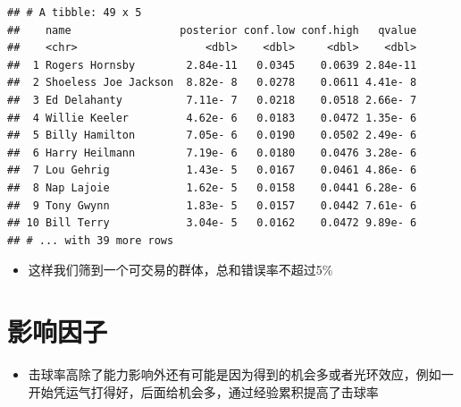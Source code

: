\documentclass[]{book}
\newenvironment{Shaded}{\begin{snugshade}}{\end{snugshade}}
\newcommand{\CommentTok}[1]{\textcolor[rgb]{0.56,0.35,0.01}{\textit{#1}}}
\newcommand{\DataTypeTok}[1]{\textcolor[rgb]{0.13,0.29,0.53}{#1}}
\newcommand{\FloatTok}[1]{\textcolor[rgb]{0.00,0.00,0.81}{#1}}
\newcommand{\KeywordTok}[1]{\textcolor[rgb]{0.13,0.29,0.53}{\textbf{#1}}}
\newcommand{\NormalTok}[1]{#1}
\newcommand{\OperatorTok}[1]{\textcolor[rgb]{0.81,0.36,0.00}{\textbf{#1}}}
\newcommand{\StringTok}[1]{\textcolor[rgb]{0.31,0.60,0.02}{#1}}
\providecommand{\tightlist}{%
  \setlength{\itemsep}{0pt}\setlength{\parskip}{0pt}}
\begin{document}
\begin{Shaded}
\end{Shaded}

\begin{verbatim}
## # A tibble: 49 x 5
##    name                 posterior conf.low conf.high   qvalue
##    <chr>                    <dbl>    <dbl>     <dbl>    <dbl>
##  1 Rogers Hornsby        2.84e-11   0.0345    0.0639 2.84e-11
##  2 Shoeless Joe Jackson  8.82e- 8   0.0278    0.0611 4.41e- 8
##  3 Ed Delahanty          7.11e- 7   0.0218    0.0518 2.66e- 7
##  4 Willie Keeler         4.62e- 6   0.0183    0.0472 1.35e- 6
##  5 Billy Hamilton        7.05e- 6   0.0190    0.0502 2.49e- 6
##  6 Harry Heilmann        7.19e- 6   0.0180    0.0476 3.28e- 6
##  7 Lou Gehrig            1.43e- 5   0.0167    0.0461 4.86e- 6
##  8 Nap Lajoie            1.62e- 5   0.0158    0.0441 6.28e- 6
##  9 Tony Gwynn            1.83e- 5   0.0157    0.0442 7.61e- 6
## 10 Bill Terry            3.04e- 5   0.0162    0.0472 9.89e- 6
## # ... with 39 more rows
\end{verbatim}

\begin{itemize}
\tightlist
\item
  这样我们筛到一个可交易的群体，总和错误率不超过5\%
\end{itemize}

\section{影响因子}

\begin{itemize}
\tightlist
\item
  击球率高除了能力影响外还有可能是因为得到的机会多或者光环效应，例如一开始凭运气打得好，后面给机会多，通过经验累积提高了击球率
\end{itemize}
\end{document}
